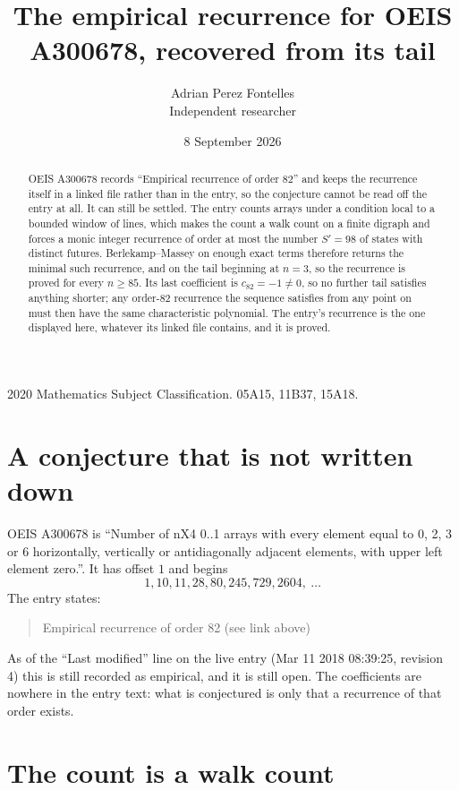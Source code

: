 \documentclass[11pt,a4paper]{article}
\title{The empirical recurrence for OEIS A300678, recovered from its tail}
\author{Adrian Perez Fontelles\\ \small Independent researcher}
\date{8 September 2026}
\theoremstyle{plain}
\theoremstyle{definition}
\begin{document}
\maketitle

\begin{abstract}
OEIS A300678 records ``Empirical recurrence of order $82$'' and keeps the recurrence itself in
a linked file rather than in the entry, so the conjecture cannot be read off the entry at all.
It can still be settled. The entry counts arrays under a condition local to a bounded window of
lines, which makes the count a walk count on a finite digraph and forces a monic integer
recurrence of order at most the number $S'=98$ of states with distinct futures. Berlekamp--Massey on
enough exact terms therefore returns the minimal such recurrence, and on the tail beginning at $n=3$, so the recurrence is proved for every $n\ge85$.
Its last coefficient is $c_{82}=-1\neq0$, so no further tail satisfies anything
shorter; any order-$82$ recurrence the sequence satisfies from any point on must then have
the same characteristic polynomial. The entry's recurrence is the one displayed here, whatever
its linked file contains, and it is proved.
\end{abstract}

\noindent\small 2020 Mathematics Subject Classification. 05A15, 11B37, 15A18.\normalsize

\section{A conjecture that is not written down}

OEIS A300678 is ``Number of nX4 0..1 arrays with every element equal to 0, 2, 3 or 6 horizontally, vertically or antidiagonally adjacent elements, with upper left element zero.''. It has offset $1$ and begins
\[
1, 10, 11, 28, 80, 245, 729, 2604,\ \dots
\]
The entry states:
\begin{quote}
Empirical recurrence of order 82 (see link above)
\end{quote}
As of the ``Last modified'' line on the live entry (Mar 11 2018 08:39:25, revision 4)
this is still recorded as empirical, and it is still open. The coefficients are nowhere in the
entry text: what is conjectured is only that a recurrence of that order exists.

\section{The count is a walk count}
\end{document}
